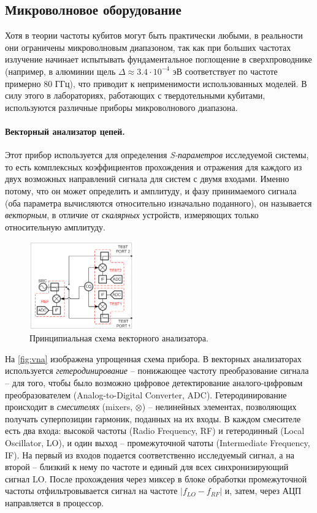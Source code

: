\documentclass[12pt, twoside]{report}
\numberwithin{equation}{section}
\numberwithin{figure}{section}
\begin{document}
\subsection{Микроволновое оборудование}

Хотя в теории частоты кубитов могут быть практически любыми, в реальности они ограничены микроволновым диапазоном, так как при больших частотах излучение начинает испытывать фундаментальное поглощение в сверхпроводнике (например, в алюминии щель $\Delta \approx 3.4 \cdot 10^{-4}$ эВ  соответствует по частоте примерно 80 ГГц), что приводит к неприменимости использованных моделей. В силу этого в лабораториях, работающих с твердотельными кубитами, используются различные приборы микроволнового диапазона.

\paragraph{Векторный анализатор цепей.} Этот прибор используется для определения \textit{S-параметров} исследуемой системы, то есть комплексных коэффициентов прохождения и отражения для каждого из двух возможных направлений сигнала для систем с двумя входами. Именно потому, что он может определить и амплитуду, и фазу принимаемого сигнала (оба параметра вычисляются относительно изначально поданного), он называется \textit{векторным}, в отличие от \textit{скалярных} устройств, измеряющих только относительную амплитуду.

\begin{figure}
\centering
\includegraphics[width=0.4\textwidth]{Pictures/vna}
\caption{Принципиальная схема векторного анализатора.}
\label{fig:vna}
\end{figure}

На \autoref{fig:vna} изображена упрощенная схема прибора. В векторных анализаторах используется \textit{гетеродинирование} -- понижающее частоту преобразование сигнала -- для того, чтобы было возможно цифровое детектирование аналого-цифровым преобразователем (Analog-to-Digital Converter, ADC). Гетеродинирование происходит в \textit{смесителях} (mixers, $\otimes$) -- нелинейных элементах, позволяющих получать суперпозиции гармоник, поданных на их входы. В каждом смесителе есть два входа: высокой частоты (Radio Frequency, RF) и гетеродинный (Local Oscillator, LO), и один выход -- промежуточной чатоты (Intermediate Frequency, IF). На первый из входов подается соответственно исследуемый сигнал, а на второй -- близкий к нему по частоте и единый для всех синхронизирующий сигнал LO. После прохождения через миксер в блоке обработки промежуточной частоты отфильтровывается сигнал на частоте $|f_{LO} - f_{RF}|$ и, затем, через АЦП направляется в процессор. 
\end{document}
